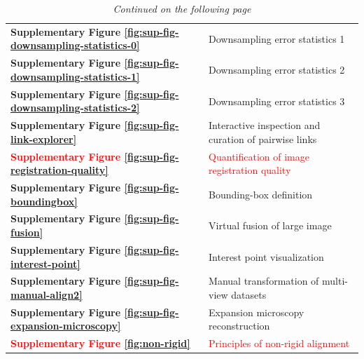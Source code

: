 \documentclass[]{spie}  %
\def\red{\textcolor{red}}
\newcommand\tablespace{\vspace{2.5mm}}
\begin{document}
\begin{table}[h!]
{\begin{tabular}{lp{11cm}}
\textbf{Supplementary Figure \ref{fig:sup-fig-downsampling-statistics-0}} & Downsampling error statistics 1 \tablespace \\
\textbf{Supplementary Figure \ref{fig:sup-fig-downsampling-statistics-1}} & Downsampling error statistics 2 \tablespace \\
\textbf{Supplementary Figure \ref{fig:sup-fig-downsampling-statistics-2}} & Downsampling error statistics 3 \tablespace \\
\textbf{Supplementary Figure \ref{fig:sup-fig-link-explorer}} & Interactive inspection and curation of pairwise links \tablespace \\
\textbf{\red{Supplementary Figure \ref{fig:sup-fig-registration-quality}}} & \red{Quantification of image registration quality}\tablespace \\
\textbf{Supplementary Figure \ref{fig:sup-fig-boundingbox}} & Bounding-box definition \tablespace \\
\textbf{Supplementary Figure \ref{fig:sup-fig-fusion}} & Virtual fusion of large image \tablespace \\
\textbf{Supplementary Figure \ref{fig:sup-fig-interest-point}} & Interest point visualization \tablespace \\
\textbf{Supplementary Figure \ref{fig:sup-fig-manual-align2}} & Manual transformation of multi-view datasets \tablespace \\
\textbf{Supplementary Figure \ref{fig:sup-fig-expansion-microscopy}} & Expansion microscopy reconstruction \tablespace \\
\textbf{\red{Supplementary Figure \ref{fig:non-rigid}}} & \red{Principles of non-rigid alignment}\tablespace \\
\end{tabular}}
\hspace{10mm}
\caption{\emph{Continued on the following page}}
\end{table}
\end{document}
